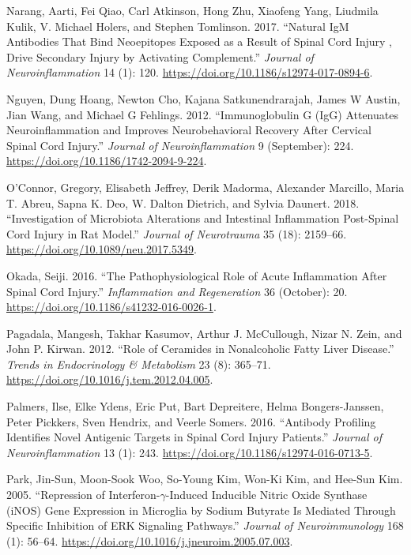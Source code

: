\documentclass[9pt,lineno]{elife}
\newlength{\cslhangindent}
\newlength{\cslentryspacingunit} %
\newenvironment{CSLReferences}[2] %
 {%
  \setlength{\parindent}{0pt}
  \ifodd #1
  \let\oldpar\par
  \def\par{\hangindent=\cslhangindent\oldpar}
  \fi
  \setlength{\parskip}{#2\cslentryspacingunit}
 }%
 {}
\begin{document}
\begin{CSLReferences}{1}{0}
\leavevmode{}%
Narang, Aarti, Fei Qiao, Carl Atkinson, Hong Zhu, Xiaofeng Yang, Liudmila Kulik, V. Michael Holers, and Stephen Tomlinson. 2017. {``Natural {IgM} Antibodies That Bind Neoepitopes Exposed as a Result of Spinal Cord Injury , Drive Secondary Injury by Activating Complement.''} \emph{Journal of Neuroinflammation} 14 (1): 120. \url{https://doi.org/10.1186/s12974-017-0894-6}.

\leavevmode{}%
Nguyen, Dung Hoang, Newton Cho, Kajana Satkunendrarajah, James W Austin, Jian Wang, and Michael G Fehlings. 2012. {``Immunoglobulin {G} ({IgG}) Attenuates Neuroinflammation and Improves Neurobehavioral Recovery After Cervical Spinal Cord Injury.''} \emph{Journal of Neuroinflammation} 9 (September): 224. \url{https://doi.org/10.1186/1742-2094-9-224}.

\leavevmode{}%
O'Connor, Gregory, Elisabeth Jeffrey, Derik Madorma, Alexander Marcillo, Maria T. Abreu, Sapna K. Deo, W. Dalton Dietrich, and Sylvia Daunert. 2018. {``Investigation of {Microbiota Alterations} and {Intestinal Inflammation Post-Spinal Cord Injury} in {Rat Model}.''} \emph{Journal of Neurotrauma} 35 (18): 2159--66. \url{https://doi.org/10.1089/neu.2017.5349}.

\leavevmode{}%
Okada, Seiji. 2016. {``The Pathophysiological Role of Acute Inflammation After Spinal Cord Injury.''} \emph{Inflammation and Regeneration} 36 (October): 20. \url{https://doi.org/10.1186/s41232-016-0026-1}.

\leavevmode{}%
Pagadala, Mangesh, Takhar Kasumov, Arthur J. McCullough, Nizar N. Zein, and John P. Kirwan. 2012. {``Role of Ceramides in Nonalcoholic Fatty Liver Disease.''} \emph{Trends in Endocrinology \& Metabolism} 23 (8): 365--71. \url{https://doi.org/10.1016/j.tem.2012.04.005}.

\leavevmode{}%
Palmers, Ilse, Elke Ydens, Eric Put, Bart Depreitere, Helma Bongers-Janssen, Peter Pickkers, Sven Hendrix, and Veerle Somers. 2016. {``Antibody Profiling Identifies Novel Antigenic Targets in Spinal Cord Injury Patients.''} \emph{Journal of Neuroinflammation} 13 (1): 243. \url{https://doi.org/10.1186/s12974-016-0713-5}.

\leavevmode{}%
Park, Jin-Sun, Moon-Sook Woo, So-Young Kim, Won-Ki Kim, and Hee-Sun Kim. 2005. {``Repression of Interferon-{\(\gamma\)}-Induced Inducible Nitric Oxide Synthase ({iNOS}) Gene Expression in Microglia by Sodium Butyrate Is Mediated Through Specific Inhibition of {ERK} Signaling Pathways.''} \emph{Journal of Neuroimmunology} 168 (1): 56--64. \url{https://doi.org/10.1016/j.jneuroim.2005.07.003}.


\end{CSLReferences}
\end{document}

